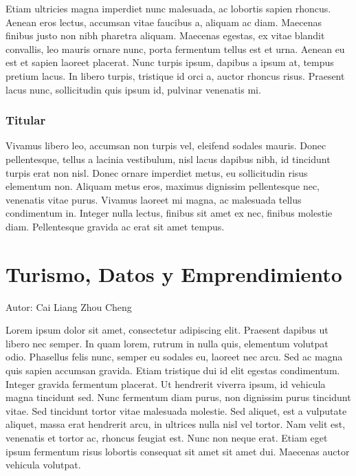 \documentclass[
  letterpaper,
  DIV=11,
  numbers=noendperiod]{scrreprt}
\begin{document}
Etiam ultricies magna imperdiet nunc malesuada, ac lobortis sapien
rhoncus. Aenean eros lectus, accumsan vitae faucibus a, aliquam ac diam.
Maecenas finibus justo non nibh pharetra aliquam. Maecenas egestas, ex
vitae blandit convallis, leo mauris ornare nunc, porta fermentum tellus
est et urna. Aenean eu est et sapien laoreet placerat. Nunc turpis
ipsum, dapibus a ipsum at, tempus pretium lacus. In libero turpis,
tristique id orci a, auctor rhoncus risus. Praesent lacus nunc,
sollicitudin quis ipsum id, pulvinar venenatis mi.

\hypertarget{titular-3}{%
\subsection*{Titular}\label{titular-3}}

Vivamus libero leo, accumsan non turpis vel, eleifend sodales mauris.
Donec pellentesque, tellus a lacinia vestibulum, nisl lacus dapibus
nibh, id tincidunt turpis erat non nisl. Donec ornare imperdiet metus,
eu sollicitudin risus elementum non. Aliquam metus eros, maximus
dignissim pellentesque nec, venenatis vitae purus. Vivamus laoreet mi
magna, ac malesuada tellus condimentum in. Integer nulla lectus, finibus
sit amet ex nec, finibus molestie diam. Pellentesque gravida ac erat sit
amet tempus.


\hypertarget{turismo-datos-y-emprendimiento}{%
\chapter{Turismo, Datos y
Emprendimiento}\label{turismo-datos-y-emprendimiento}}

Autor: Cai Liang Zhou Cheng

Lorem ipsum dolor sit amet, consectetur adipiscing elit. Praesent
dapibus ut libero nec semper. In quam lorem, rutrum in nulla quis,
elementum volutpat odio. Phasellus felis nunc, semper eu sodales eu,
laoreet nec arcu. Sed ac magna quis sapien accumsan gravida. Etiam
tristique dui id elit egestas condimentum. Integer gravida fermentum
placerat. Ut hendrerit viverra ipsum, id vehicula magna tincidunt sed.
Nunc fermentum diam purus, non dignissim purus tincidunt vitae. Sed
tincidunt tortor vitae malesuada molestie. Sed aliquet, est a vulputate
aliquet, massa erat hendrerit arcu, in ultrices nulla nisl vel tortor.
Nam velit est, venenatis et tortor ac, rhoncus feugiat est. Nunc non
neque erat. Etiam eget ipsum fermentum risus lobortis consequat sit amet
sit amet dui. Maecenas auctor vehicula volutpat.
\end{document}
